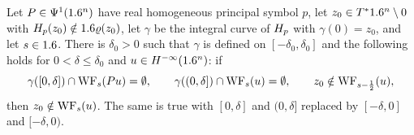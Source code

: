 \begin{proposition}\label{microlocal:prop:propagation-local}
  Let $P\in\Psi^{1}(1.6^n)$ have real homogeneous principal symbol $p$, let
  $z_0\in T^*1.6^n\setminus0$ with $H_{p}(z_0)\notin1.6\varrho(z_0)$, let $\gamma$ be the
  integral curve of $H_{p}$ with $\gamma(0)=z_0$, and let $s\in1.6$. There is
  $\delta_0>0$ such that $\gamma$ is defined on $[-\delta_0,\delta_0]$ and the
  following holds for $0<\delta\le\delta_0$ and $u\in H^{-\infty}(1.6^n)$: if
  \begin{equation}\label{microlocal:eq:prop-hyp}
    \gamma([0,\delta])\cap\operatorname{WF}_s(Pu)=\emptyset,\qquad
    \gamma((0,\delta])\cap\operatorname{WF}_s(u)=\emptyset,\qquad
    z_0\notin\operatorname{WF}_{s-\frac12}(u),
  \end{equation}
  then $z_0\notin\operatorname{WF}_s(u)$. The same is true with $[0,\delta]$ and $(0,\delta]$
  replaced by $[-\delta,0]$ and $[-\delta,0)$.
\end{proposition}

